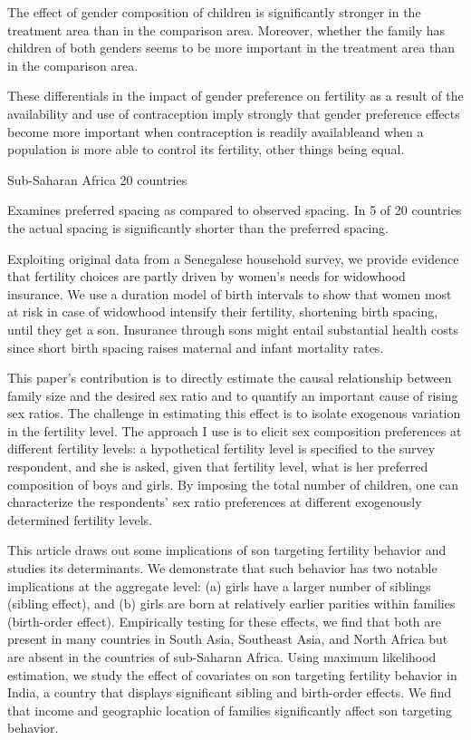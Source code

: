 The effect of gender composition of children is significantly stronger
in the treatment area than in the comparison area. Moreover, whether the
family has children of both genders seems to be more important in the
treatment area than in the comparison area.

These differentials in the impact of gender preference on fertility as a
result of the availability and use of contraception imply strongly that
gender preference effects become more important when contraception is
readily availableand when a population is more able to control its
fertility, other things being equal.

\citep{Rafalitnanana2000} 

Sub-Saharan Africa 20 countries

Examines preferred spacing as compared to observed spacing. In 5 of 20
countries the
actual spacing is significantly shorter than the preferred spacing.


\citep{Lambert2016}

Exploiting original data from a Senegalese household survey, we provide
evidence that fertility choices are partly driven by women's needs for
widowhood insurance. We use a duration model of birth intervals to show
that women most at risk in case of widowhood intensify their fertility,
shortening birth spacing, until they get a son. Insurance through sons
might entail substantial health costs since short birth spacing raises
maternal and infant mortality rates.

\citep{Jayachandran2017}

This paper’s contribution is to directly estimate the causal
relationship between family size and the desired sex ratio and to
quantify an important cause of rising sex ratios. The challenge in
estimating this effect is to isolate exogenous variation in the
fertility level. The approach I use is to elicit sex composition
preferences at different fertility levels: a hypothetical fertility
level is specified to the survey respondent, and she is asked, given
that fertility level, what is her preferred composition of boys and
girls. By imposing the total number of children, one can characterize
the respondents’ sex ratio preferences at different exogenously
determined fertility levels.


\citep{Basu2010}

This article draws out some implications of son targeting fertility
behavior and studies its determinants. We demonstrate that such behavior
has two notable implications at the aggregate level: (a) girls have a
larger number of siblings (sibling effect), and (b) girls are born at
relatively earlier parities within families (birth-order effect).
Empirically testing for these effects, we find that both are present in
many countries in South Asia, Southeast Asia, and North Africa but are
absent in the countries of sub-Saharan Africa. Using maximum likelihood
estimation, we study the effect of covariates on son targeting fertility
behavior in India, a country that displays significant sibling and
birth-order effects. We find that income and geographic location of
families significantly affect son targeting behavior.

